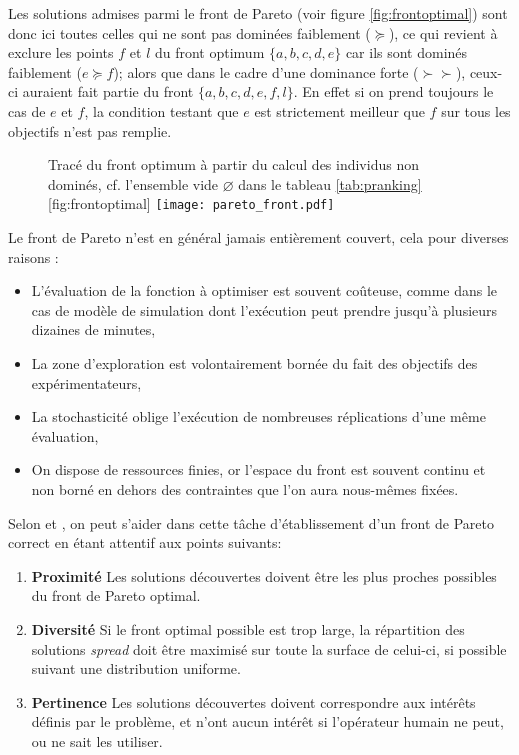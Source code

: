 Les solutions admises parmi le front de Pareto (voir figure \ref{fig:frontoptimal}) sont donc ici toutes celles qui ne sont pas dominées faiblement ($\succeq$), ce qui revient à exclure les points $f$ et $l$ du front optimum $\{a,b,c,d,e\}$ car ils sont dominés faiblement ($e \succeq f$); alors que dans le cadre d'une dominance forte ($\succ \succ$), ceux-ci auraient fait partie du front $\{a,b,c,d,e,f,l\}$. En effet si on prend toujours le cas de $e$ et $f$, la condition testant que $e$ est strictement meilleur que $f$ sur tous les objectifs n'est pas remplie. %

\begin{figure}[!htb]
	\begin{sidecaption}[fortoc]{Tracé du front optimum à partir du calcul des individus non dominés, cf. l'ensemble vide $\varnothing$ dans le tableau \ref{tab:pranking}}[fig:frontoptimal]
		\centering
		\texttt{[image: pareto\_front.pdf]}{
		}
  \end{sidecaption}
\end{figure}

Le front de Pareto n'est en général jamais entièrement couvert, cela pour diverses raisons :

\begin{itemize}
\item L'évaluation de la fonction à optimiser est souvent coûteuse, comme dans le cas de modèle de simulation dont l'exécution peut prendre jusqu'à plusieurs dizaines de minutes,
\item La zone d'exploration est volontairement bornée du fait des objectifs des expérimentateurs,
\item La stochasticité oblige l'exécution de nombreuses réplications d'une même évaluation,
\item On dispose de ressources finies, or l'espace du front est souvent continu et non borné en dehors des contraintes que l'on aura nous-mêmes fixées.
\end{itemize}

Selon \textcite[70]{Weise2011} et \autocite[19]{Zitzler1999a}, on peut s'aider dans cette tâche d'établissement d'un front de Pareto correct en étant attentif aux points suivants:

\begin{enumerate}
\item{\textbf{Proximité}} Les solutions découvertes doivent être les plus proches possibles du front de Pareto optimal.
\item{\textbf{Diversité}} Si le front optimal possible est trop large, la répartition des solutions \textit{spread} doit être maximisé sur toute la surface de celui-ci, si possible suivant une distribution uniforme.
\item{\textbf{Pertinence}} Les solutions découvertes doivent correspondre aux intérêts définis par le problème, et n'ont aucun intérêt si l'opérateur humain ne peut, ou ne sait les utiliser.
\end{enumerate}


